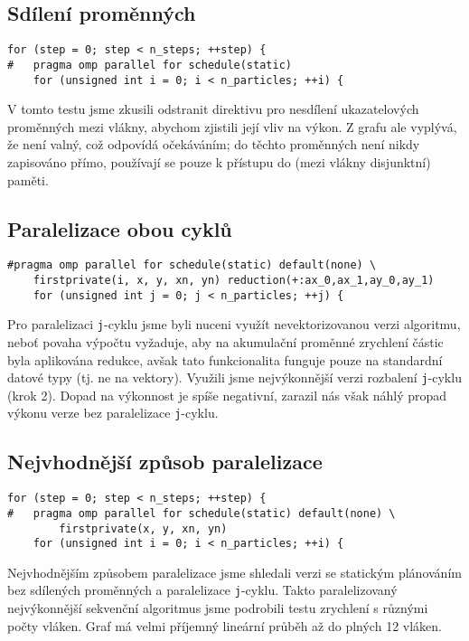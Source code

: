 \documentclass[10pt,a4paper]{article}
\begin{document}
\vspace{10pt}
\subsection{Sdílení proměnných}
\begin{lstlisting}
for (step = 0; step < n_steps; ++step) {
#   pragma omp parallel for schedule(static)
    for (unsigned int i = 0; i < n_particles; ++i) {
\end{lstlisting}

V tomto testu jsme zkusili odstranit direktivu pro nesdílení
ukazatelových proměnných mezi vlákny, abychom zjistili její
vliv na výkon. Z grafu ale vyplývá, že není valný, což odpovídá
očekáváním; do těchto proměnných není nikdy zapisováno přímo, používají
se pouze k přístupu do (mezi vlákny disjunktní) paměti.

\vspace{10pt}
\subsection{Paralelizace obou cyklů}
\begin{lstlisting}
#pragma omp parallel for schedule(static) default(none) \
    firstprivate(i, x, y, xn, yn) reduction(+:ax_0,ax_1,ay_0,ay_1)
    for (unsigned int j = 0; j < n_particles; ++j) {
\end{lstlisting}

Pro paralelizaci \texttt{j}-cyklu jsme byli nuceni využít
nevektorizovanou verzi algoritmu, neboť povaha výpočtu vyžaduje, aby
na akumulační proměnné zrychlení částic byla aplikována redukce, avšak
tato funkcionalita funguje pouze na standardní datové typy (tj. ne na
vektory). Využili jsme nejvýkonnější verzi rozbalení \texttt{j}-cyklu
(krok 2). Dopad na výkonnost je spíše negativní, zarazil nás však náhlý
propad výkonu verze bez paralelizace \texttt{j}-cyklu.

\vspace{10pt}
\subsection{Nejvhodnější způsob paralelizace}
\begin{lstlisting}
for (step = 0; step < n_steps; ++step) {
#   pragma omp parallel for schedule(static) default(none) \
        firstprivate(x, y, xn, yn)
    for (unsigned int i = 0; i < n_particles; ++i) {
\end{lstlisting}

Nejvhodnějším způsobem paralelizace jsme shledali verzi se statickým
plánováním bez sdílených proměnných a paralelizace \texttt{j}-cyklu.
Takto paralelizovaný nejvýkonnější sekvenční algoritmus jsme podrobili
testu zrychlení s různými počty vláken. Graf má velmi příjemný lineární
průběh až do plných 12 vláken.
\end{document}
